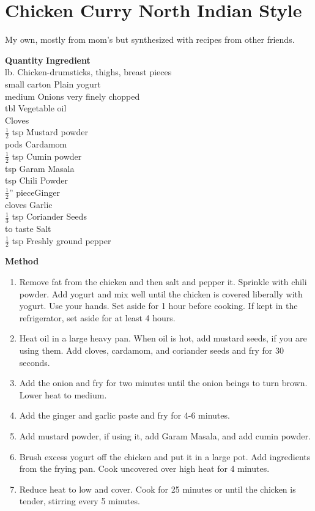\section{Chicken Curry North Indian Style}
  My own, mostly from mom's but synthesized with recipes from other friends.

\begin{tabbing}
\hspace{1.0cm}  \={\bf Quantity}   \hspace{3.0cm} \={\bf Ingredient}\\
  lb.  \>Chicken-drumsticks, thighs, breast pieces\\
 small carton    \>Plain yogurt\\
 medium    \>Onions very finely chopped\\
  tbl   \>Vegetable oil\\
    \>Cloves\\
 \>$\frac{1}{2}$ tsp    \>Mustard powder\\
  pods    \>Cardamom\\
 \>$\frac{1}{2}$ tsp   \>Cumin powder\\
  tsp    \>Garam  Masala\\
  tsp   \>Chili Powder\\
\>$\frac{1}{2}$''  piece\>Ginger \\
 cloves \>Garlic \\
\>$\frac{1}{3}$ tsp   \>Coriander Seeds \\
\>to taste \>Salt \\
\>$\frac{1}{2}$ tsp   \>Freshly ground pepper \\
\end{tabbing}

{\bf Method}
\begin{enumerate}
   \item Remove fat from the chicken and then salt and pepper it.  Sprinkle
      with chili powder.  Add yogurt and mix  well  until  the  chicken  is
      covered  liberally  with  yogurt.   Use your hands.  Set aside for 1
      hour before cooking.  If kept in the refrigerator, set aside for  at  least  4
      hours.
   \item Heat  oil  in a large heavy pan.  When oil is hot, add mustard seeds,
      if you are using them.  Add cloves, cardamom, and coriander  seeds and fry for 30 seconds.
   \item Add  the onion and fry for two minutes until the onion beings to turn brown.  Lower
      heat to medium.
   \item Add the ginger and garlic paste and fry for 4-6 minutes.
   \item Add mustard powder, if using it,  add  Garam  Masala,  and add  cumin
      powder.
   \item Brush  excess  yogurt  off  the chicken and put it in a large pot.  Add
      ingredients from the frying pan.  Cook uncovered over high  heat  for  4
      minutes.
   \item Reduce  heat  to  low and cover. Cook for 25 minutes or until the
      chicken is tender, stirring every 5 minutes.
\end{enumerate}

